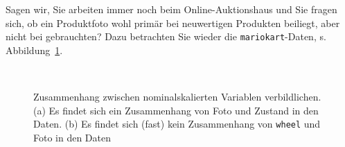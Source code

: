 \documentclass[
  letterpaper,
  oneside,
  open=any]{scrbook}
\theoremstyle{definition}
\theoremstyle{definition}
\theoremstyle{definition}
\theoremstyle{remark}
\begin{document}
Sagen wir, Sie arbeiten immer noch beim Online-Auktionshaus und Sie
fragen sich, ob ein Produktfoto wohl primär bei neuwertigen Produkten
beiliegt, aber nicht bei gebrauchten? Dazu betrachten Sie wieder die
\texttt{mariokart}-Daten, s. Abbildung~\ref{fig-zshg-nom1}.

\begin{figure}

\begin{minipage}{0.45\linewidth}



\end{minipage}%
%
\begin{minipage}{0.10\linewidth}
~\end{minipage}%
%
\begin{minipage}{0.45\linewidth}



\end{minipage}%

\caption{\label{fig-zshg-nom1}Zusammenhang zwischen nominalskalierten
Variablen verbildlichen. (a) Es findet sich ein Zusammenhang von Foto
und Zustand in den Daten. (b) Es findet sich (fast) kein Zusammenhang
von \texttt{wheel} und Foto in den Daten}

\end{figure}%
\end{document}
